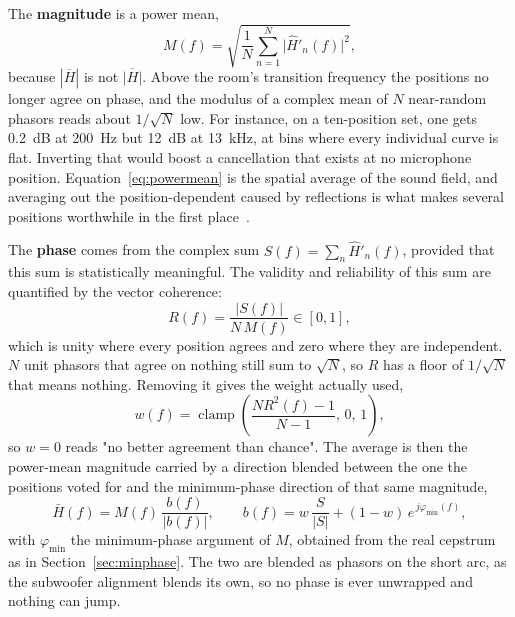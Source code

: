 The \textbf{magnitude} is a power mean,
\begin{equation}
  M(f) = \sqrt{\frac{1}{N}\sum_{n=1}^{N} \bigl|\hat H'_n(f)\bigr|^2 },
  \label{eq:powermean}
\end{equation}
because $|\overline{H}|$ is not $\overline{|H|}$. Above the room's transition frequency the positions no longer agree on phase, and the modulus of a complex mean of $N$ near-random phasors reads about $1/\sqrt N$ low. For instance, on a ten-position set, one gets \SI{0.2}{\dB} at \SI{200}{\hertz} but \SI{12}{\dB} at \SI{13}{\kilo\hertz}, at bins where every individual curve is flat. Inverting that would boost a cancellation that exists at no microphone position. Equation~\ref{eq:powermean} is the spatial average of the sound field, and averaging out the position-dependent  caused by reflections is what makes several positions worthwhile in the first place~\cite{Toole,Mourjopoulos1994}.

The \textbf{phase} comes from the complex sum $S(f)=\sum_n \hat H'_n(f)$, provided that this sum is statistically meaningful. The validity and reliability of this sum are quantified by the vector coherence:
\begin{equation}
  R(f) = \frac{|S(f)|}{N\,M(f)} \in [0,1],
  \label{eq:veccoherence}
\end{equation}
which is unity where every position agrees and zero where they are independent. $N$ unit phasors that agree on nothing still sum to $\sqrt N$, so $R$ has a floor of $1/\sqrt N$ that means nothing. Removing it gives the weight actually used,
\begin{equation}
  w(f) = \operatorname{clamp}\!\left( \frac{N R^2(f) - 1}{N-1},\, 0,\, 1 \right),
  \label{eq:phaseweight}
\end{equation}
so $w=0$ reads "no better agreement than chance". The average is then the power-mean magnitude carried by a direction blended between the one the positions voted for and the minimum-phase direction of that same magnitude,
\begin{equation}
  \bar H(f) = M(f)\,\frac{b(f)}{|b(f)|},\qquad
  b(f) = w\,\frac{S}{|S|} + (1-w)\,e^{\,j\varphi_{\min}(f)},
  \label{eq:blendedaverage}
\end{equation}
with $\varphi_{\min}$ the minimum-phase argument of $M$, obtained from the real cepstrum as in Section~\ref{sec:minphase}. The two are blended as phasors on the short arc, as the subwoofer alignment blends its own, so no phase is ever unwrapped and nothing can jump.

